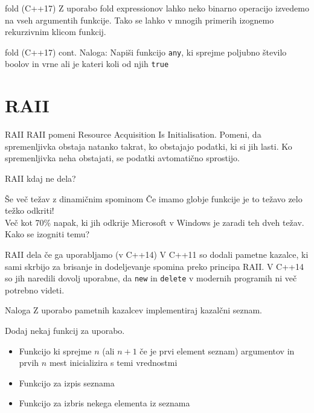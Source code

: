 \documentclass{beamer}
\begin{document}
\begin{frame}{fold (C++17)}
  Z uporabo fold expressionov lahko neko binarno operacijo izvedemo na vseh argumentih funkcije. Tako se lahko v mnogih primerih izognemo rekurzivnim klicom funkcij.
\end{frame}
\begin{frame}{fold (C++17) cont.}
  Naloga: Napiši funkcijo \texttt{any}, ki sprejme poljubno število boolov in vrne ali je kateri koli od njih \texttt{true}
\end{frame}

\section{RAII}
\begin{frame}{RAII}
  RAII pomeni Resource Acquisition Is Initialisation. Pomeni, da spremenljivka obstaja natanko takrat, ko obstajajo podatki, ki si jih lasti. Ko spremenljivka neha obstajati, se podatki avtomatično sprostijo.
\end{frame}

\begin{frame}{RAII kdaj ne dela?}
\end{frame}

\begin{frame}{Še več težav z dinamičnim spominom}
  Če imamo globje funkcije je to težavo zelo težko odkriti!\\
  Več kot 70\% napak, ki jih odkrije Microsoft v Windows je zaradi teh dveh težav. Kako se izogniti temu?
\end{frame}

\begin{frame}{RAII dela če ga uporabljamo (v C++14)}
  V C++11 so dodali pametne kazalce, ki sami skrbijo za brisanje in dodeljevanje spomina preko principa RAII. V C++14 so jih naredili dovolj uporabne, da \texttt{new} in \texttt{delete} v modernih programih ni več potrebno videti.
\end{frame}

\begin{frame}{Naloga}
  Z uporabo pametnih kazalcev implementiraj kazalčni seznam.

  Dodaj nekaj funkcij za uporabo.
  \begin{itemize}
  \item Funkcijo ki sprejme \(n\) (ali \(n+1\) če je prvi element seznam) argumentov in prvih \(n\) mest inicializira s temi vrednostmi
  \item Funkcijo za izpis seznama
  \item Funkcijo za izbris nekega elementa iz seznama
  \end{itemize}
\end{frame}
\end{document}
